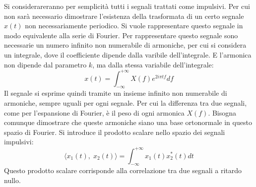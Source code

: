 \documentclass{article}
\numberwithin{equation}{subsection}
\begin{document}
Si considerareranno per semplicità tutti i segnali trattati come impulsivi. Per cui non sarà necessario dimostrare l'esistenza della trasformata di un certo segnale $x(t)$ 
non necessariamente periodico. Si vuole rappresentare questo segnale in modo equivalente alla serie di Fourier. Per rappresentare questo segnale sono necessarie un numero 
infinito non numerabile di armoniche, per cui si considera un integrale, dove il coefficiente dipende dalla varibile dell'integrale. E l'armonica non dipende dal parametro 
$k$, ma dalla stessa variabile dell'integrale:
\begin{equation*}
    x(t)=\displaystyle\int_{-\infty}^{+\infty}X(f)e^{2i\pi tf}df
\end{equation*}
Il segnale si esprime quindi tramite un insieme infinito non numerabile di armoniche, sempre uguali per ogni segnale. Per cui la differenza tra due segnali, come per 
l'espansione di Fourier, è il peso di ogni armonica $X(f)$. Bisogna comunque dimostrare che queste armoniche siano una base ortonormale in questo spazio di Fourier. Si 
introduce il prodotto scalare nello spazio dei segnali impulsivi:
\begin{equation*}
    \langle x_1(t),\;x_2(t)\rangle=\displaystyle\int_{-\infty}^{+\infty}x_1(t)x_2^*(t)dt
\end{equation*}
Questo prodotto scalare corrisponde alla correlazione tra due segnali a ritardo nullo. 
\end{document}
